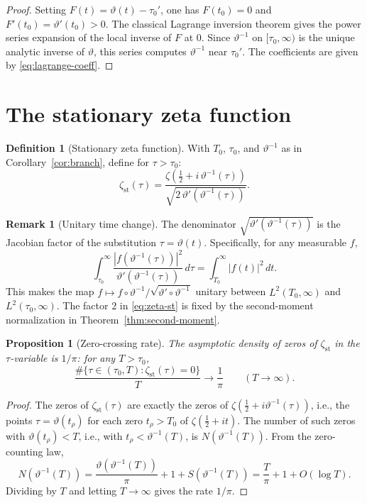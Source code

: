 \documentclass[11pt]{article}
\numberwithin{equation}{section}
\theoremstyle{plain}
\newtheorem{proposition}[theorem]{Proposition}
\theoremstyle{definition}
\newtheorem{definition}[theorem]{Definition}
\newtheorem{remark}[theorem]{Remark}
\begin{document}
\begin{proof}
Setting \(F(t)=\vartheta(t)-\tau_0'\), one has \(F(t_0)=0\) and
\(F'(t_0)=\vartheta'(t_0)>0\). The classical Lagrange inversion theorem gives the
power series expansion of the local inverse of \(F\) at \(0\). Since
\(\vartheta^{-1}\) on \([\tau_0,\infty)\) is the unique analytic inverse of \(\vartheta\),
this series computes \(\vartheta^{-1}\) near \(\tau_0'\). The coefficients are given
by \eqref{eq:lagrange-coeff}.
\end{proof}

\section{The stationary zeta function}

\begin{definition}[Stationary zeta function]
\label{def:zeta-st}
With \(T_0\), \(\tau_0\), and \(\vartheta^{-1}\) as in Corollary~\ref{cor:branch},
define for \(\tau>\tau_0\):
\begin{equation}
\zeta_{\mathrm{st}}(\tau)
=
\frac{
\zeta\!\left(\frac12+i\,\vartheta^{-1}(\tau)\right)
}{
\sqrt{2\,\vartheta'(\vartheta^{-1}(\tau))}
}.
\label{eq:zeta-st}
\end{equation}
\end{definition}

\begin{remark}[Unitary time change]
The denominator \(\sqrt{\vartheta'(\vartheta^{-1}(\tau))}\) is the Jacobian factor of
the substitution \(\tau=\vartheta(t)\). Specifically, for any measurable \(f\),
\[
\int_{\tau_0}^\infty
\frac{|f(\vartheta^{-1}(\tau))|^2}{\vartheta'(\vartheta^{-1}(\tau))}\,d\tau
=
\int_{T_0}^\infty |f(t)|^2\,dt.
\]
This makes the map \(f\mapsto f\circ\vartheta^{-1}/\sqrt{\vartheta'\circ\vartheta^{-1}}\)
unitary between \(L^2(T_0,\infty)\) and \(L^2(\tau_0,\infty)\). The factor \(2\) in
\eqref{eq:zeta-st} is fixed by the second-moment normalization in Theorem~\ref{thm:second-moment}.
\end{remark}

\begin{proposition}[Zero-crossing rate]
\label{prop:zeros}
The asymptotic density of zeros of \(\zeta_{\mathrm{st}}\) in the \(\tau\)-variable
is \(1/\pi\): for any \(T>\tau_0\),
\[
\frac{\#\{\tau\in(\tau_0,T):\zeta_{\mathrm{st}}(\tau)=0\}}{T}
\to
\frac{1}{\pi}
\qquad(T\to\infty).
\]
\end{proposition}

\begin{proof}
The zeros of \(\zeta_{\mathrm{st}}(\tau)\) are exactly the zeros of
\(\zeta(\frac12+i\vartheta^{-1}(\tau))\), i.e., the points
\(\tau=\vartheta(t_\rho)\) for each zero \(t_\rho>T_0\) of \(\zeta(\frac12+it)\).
The number of such zeros with \(\vartheta(t_\rho)<T\), i.e., with \(t_\rho<\vartheta^{-1}(T)\),
is \(N(\vartheta^{-1}(T))\). From the zero-counting law,
\[
N(\vartheta^{-1}(T))
=
\frac{\vartheta(\vartheta^{-1}(T))}{\pi}+1+S(\vartheta^{-1}(T))
=
\frac{T}{\pi}+1+O(\log T).
\]
Dividing by \(T\) and letting \(T\to\infty\) gives the rate \(1/\pi\).
\end{proof}
\end{document}
